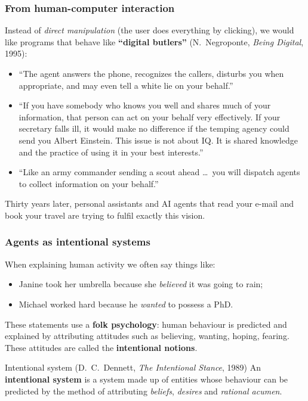 \subsubsection{From human-computer interaction}

Instead of \emph{direct manipulation} (the user does everything by clicking), we would like
programs that behave like \textbf{``digital butlers''} (N.~Negroponte, \emph{Being
Digital}, 1995):
\begin{itemize}[nosep]
  \item ``The agent answers the phone, recognizes the callers, disturbs you when
        appropriate, and may even tell a white lie on your behalf.''
  \item ``If you have somebody who knows you well and shares much of your information,
        that person can act on your behalf very effectively. If your secretary falls ill, it
        would make no difference if the temping agency could send you Albert Einstein. This
        issue is not about IQ. It is shared knowledge and the practice of using it in your
        best interests.''
  \item ``Like an army commander sending a scout ahead \ldots\ you will dispatch agents to
        collect information on your behalf.''
\end{itemize}
Thirty years later, personal assistants and AI agents that read your e-mail and book your
travel are trying to fulfil exactly this vision.

\subsubsection{Agents as intentional systems}

When explaining human activity we often say things like:
\begin{itemize}[nosep]
  \item Janine took her umbrella because she \emph{believed} it was going to rain;
  \item Michael worked hard because he \emph{wanted} to possess a PhD.
\end{itemize}
These statements use a \textbf{folk psychology}: human behaviour is predicted and explained
by attributing attitudes such as believing, wanting, hoping, fearing. These attitudes are
called the \textbf{intentional notions}.

\begin{nbdef}{Intentional system (D.~C.~Dennett, \emph{The Intentional Stance}, 1989)}
An \textbf{intentional system} is a system made up of entities whose behaviour can be
predicted by the method of attributing \emph{beliefs}, \emph{desires} and \emph{rational
acumen}.
\end{nbdef}

